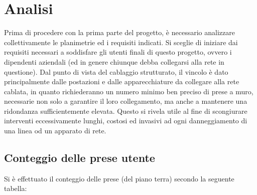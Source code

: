 %

\section{Analisi}
Prima di procedere con la prima parte del progetto, è necessario analizzare collettivamente
le planimetrie ed i requisiti indicati. Si sceglie di iniziare dai requisiti necessari a soddisfare
gli utenti finali di questo progetto, ovvero i dipendenti aziendali (ed in genere chiunque debba collegarsi
alla rete in questione). Dal punto di vista del cablaggio strutturato, il vincolo è dato principalmente dalle
postazioni e dalle apparecchiature da collegare alla rete cablata, in quanto richiederanno un numero minimo
ben preciso di prese a muro, necessarie non solo a garantire il loro collegamento, ma anche a mantenere una ridondanza
sufficientemente elevata. Questo si rivela utile al fine di scongiurare interventi eccessivamente lunghi,
costosi ed invasivi ad ogni danneggiamento di una linea od un apparato di rete.

\subsection{Conteggio delle prese utente}

Si è effettuato il conteggio delle prese (del piano terra) secondo la seguente tabella:

